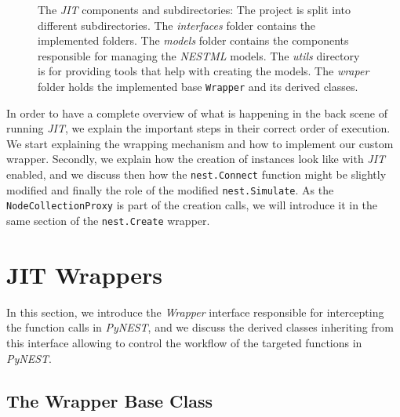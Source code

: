 \begin{figure}[ht!]
{
    }
    \caption{The \emph{JIT} components and subdirectories: The project is split into different subdirectories. The \emph{interfaces} folder contains the implemented folders. The \emph{models} folder contains the components responsible for managing the \emph{NESTML} models. The \emph{utils} directory is for providing tools that help with creating the models. The \emph{wraper} folder holds the implemented base \texttt{Wrapper} and its derived classes. }
    \label{fig:jit_module}

\end{figure}


In order to have a complete overview of what is happening in the back scene of running \emph{JIT}, we explain the important steps in their correct order of execution. We start explaining the wrapping mechanism and how to implement our custom wrapper. Secondly, we explain how the creation of instances look like with \emph{JIT} enabled, and we discuss then how the \texttt{nest.Connect} function might be slightly modified and finally the role of the modified \texttt{nest.Simulate}. As the \texttt{NodeCollectionProxy} is part of the creation calls, we will introduce it in the same section of  the \texttt{nest.Create} wrapper.





\section{JIT Wrappers}

In this section, we introduce the \emph{Wrapper} interface responsible for intercepting the function calls in \emph{PyNEST}, and we discuss the derived classes inheriting from this interface allowing to control the workflow of the targeted functions in \emph{PyNEST}.

\subsection{The Wrapper Base Class}

